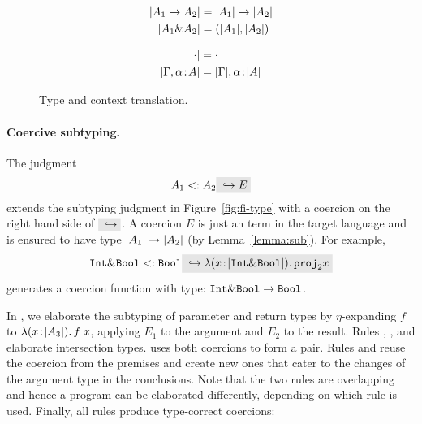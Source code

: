 \begin{figure}[h]

  \begin{align*}
    \lvert A_1 \to A_2 \rvert    &= \lvert A_1 \rvert \to \lvert A_2 \rvert \\
    \lvert A_1 \& A_2 \rvert &= (\lvert A_1 \rvert, \lvert A_2 \rvert) \\
  \end{align*}


  \begin{align*}
    \lvert \cdot \rvert                      &= \cdot \\
    \lvert \Gamma, \alpha \!:\! A \rvert &= \lvert \Gamma \rvert, \alpha \!:\! \lvert A \rvert
  \end{align*}

  \caption{Type and context translation.}
  \label{fig:type-and-context-translation}
\end{figure}


\paragraph{Coercive subtyping.}

The judgment
\[
A_1 \subtype A_2 \yields E
\]
extends the subtyping judgment in Figure~\ref{fig:fi-type} with a coercion
on the right hand side of $ \yields {} $. A coercion $ E $ is just an term
in the target language and is ensured to have type
$ \lvert A_1 \rvert \to \lvert A_2 \rvert $ (by Lemma~\ref{lemma:sub}). For example,
\[
\tyint \inter \tybool \subtype \tybool \yields {\lamty x {\im {\tyint \inter \tybool}} {\proj 2 x}}
\]
generates a coercion function with type: $\texttt{Int} \& \texttt{Bool} \to \texttt{Bool}$.

In , we elaborate the subtyping of
parameter and return types by $\eta$-expanding $f$ to $\lambda (x \!:\! \lvert A_3 \rvert).\, f \; x$, applying $E_1$ to the argument and $E_2$ to the result. Rules
, , and
 elaborate intersection types.
 uses both coercions to form a pair. Rules
 and  reuse the coercion
from the premises and create new ones that cater to the changes of the argument
type in the conclusions. Note that the two rules are overlapping and
hence a program can be elaborated differently, depending on which rule
is used. Finally, all rules produce type-correct coercions:

